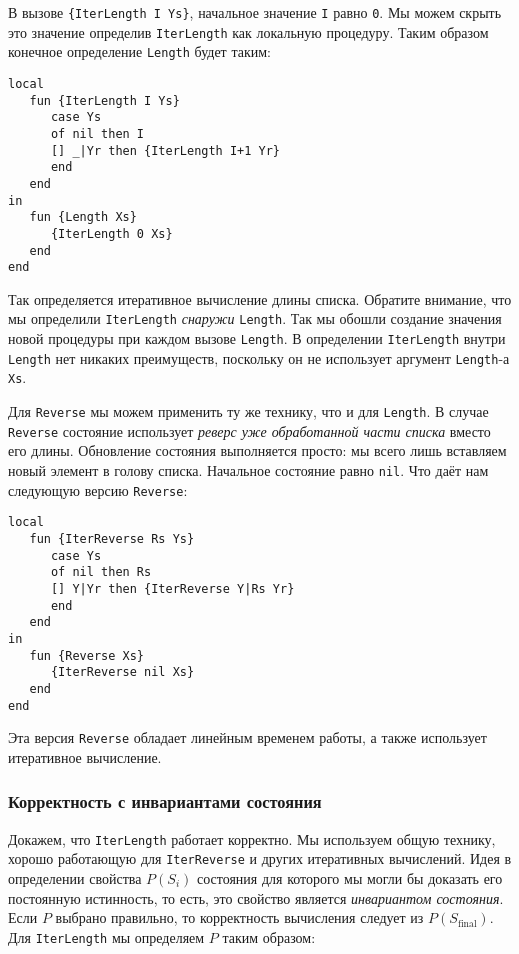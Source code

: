 В вызове \lstinline!{IterLength I Ys}!, начальное значение \lstinline!I! равно \lstinline!0!. Мы можем скрыть это значение определив \lstinline!IterLength! как локальную процедуру. Таким образом конечное определение \lstinline!Length! будет таким:

\begin{lstlisting}
local
   fun {IterLength I Ys}
      case Ys
      of nil then I
      [] _|Yr then {IterLength I+1 Yr}
      end
   end
in
   fun {Length Xs}
      {IterLength 0 Xs}
   end
end
\end{lstlisting}

Так определяется итеративное вычисление длины списка. Обратите внимание, что мы определили \lstinline!IterLength! \emph{снаружи} \lstinline!Length!. Так мы обошли создание значения новой процедуры при каждом вызове \lstinline!Length!. В определении \lstinline!IterLength! внутри \lstinline!Length! нет никаких преимуществ, поскольку он не использует аргумент \lstinline!Length!-а \lstinline!Xs!.

Для \lstinline!Reverse! мы можем применить ту же технику, что и для \lstinline!Length!. В случае \lstinline!Reverse! состояние использует \emph{реверс уже обработанной части списка} вместо его длины. Обновление состояния выполняется просто: мы всего лишь вставляем новый элемент в голову списка. Начальное состояние равно \lstinline!nil!. Что даёт нам следующую версию \lstinline!Reverse!:

\begin{lstlisting}
local
   fun {IterReverse Rs Ys}
      case Ys
      of nil then Rs
      [] Y|Yr then {IterReverse Y|Rs Yr}
      end
   end
in
   fun {Reverse Xs}
      {IterReverse nil Xs}
   end
end
\end{lstlisting}

Эта версия \lstinline!Reverse! обладает линейным временем работы, а также использует итеративное вычисление.

\subsubsection{Корректность с инвариантами состояния}

Докажем, что \lstinline!IterLength! работает корректно. Мы используем общую технику, хорошо работающую для \lstinline!IterReverse! и других итеративных вычислений. Идея в определении свойства $P(S_i)$ состояния для которого мы могли бы доказать его постоянную истинность, то есть, это свойство является \emph{инвариантом состояния}. Если $P$ выбрано правильно, то корректность вычисления следует из $P(S_\text{final})$. Для \lstinline!IterLength! мы определяем $P$ таким образом:

